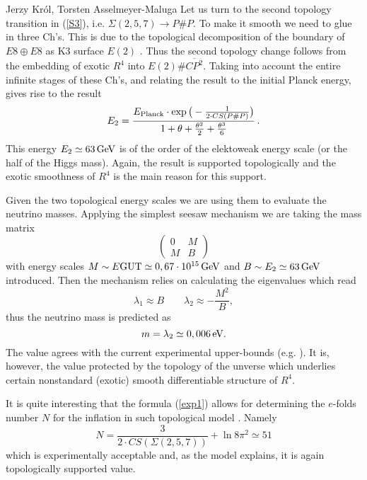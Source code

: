 \begin{artengenv2auth}{Jerzy Kr\'ol, Torsten Asselmeyer-Maluga}
Let us turn to the second topology transition in (\ref{S3}), i.e. $\Sigma(2,5,7)\to P\#P$. To make it smooth we need to glue in three Ch's. This is due to the topological decomposition of the boundary of $E8\oplus E8$ as K3 surface $E(2)$ \parencite{AK2018,AK2019}. Thus the second topology change follows from the embedding of exotic $R^4$ into $E(2)\# \overline{CP^2}$. Taking into account the entire infinite stages of these Ch's, and relating the result to the initial Planck energy, gives rise to the result 
\[E_2=\frac{E_{\rm Planck}\cdot \exp\big(-\frac{1}{2\cdot CS(P\# P)}\big)}{1+\theta +\frac{\theta^2}{2}+\frac{\theta^3}{6}}\,. \]
This energy $E_2\simeq 63\, {\rm GeV}$ is of the order of the elektoweak energy scale (or the half of the Higgs mass). Again, the result is supported topologically and the exotic smoothness of $R^4$ is the main reason for this support. 

Given the two topological energy scales we are using them to evaluate the neutrino masses. Applying the simplest seesaw mechanism we are taking the mass matrix 
\[
\left(\begin{array}{cc}
0 & M\\
M & B
\end{array}\right)
\] with energy scales $M\sim {E\rm GUT}\simeq 0,67\cdot 10^{15}\, {\rm GeV}$ and $B\sim E_2\simeq 63\, {\rm GeV}$ introduced. Then the mechanism relies on calculating the eigenvalues which read \[
\lambda_{1}\approx B\qquad\lambda_{2}\approx-\frac{M^{2}}{B},
\] thus the neutrino mass is predicted as 
\[m=\lambda_2\simeq 0,006\, {\rm eV}.   \] The value agrees with the current experimental upper-bounds (e.g. \cite{PlanckCosmoParam2015,Neutrino2015}). It is, however, the value protected by the topology of the unverse which underlies certain nonstandard (exotic) smooth differentiable structure of $R^4$. 

It is quite interesting that the formula (\ref{exp1}) allows for determining the $e$-folds number $N$ for the inflation in such topological model \parencite{AK2014,AK2019}. Namely
\[N=\frac{3}{2\cdot CS(\Sigma(2,5,7))} + \ln 8 \pi^2 \simeq 51 \] which is experimentally acceptable and, as the model explains, it is again topologically supported value.

\end{artengenv2auth}
